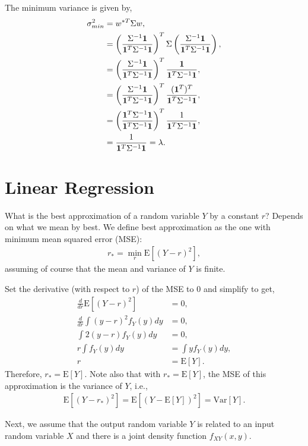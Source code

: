 \documentclass{amsart}
\theoremstyle{plain}
\numberwithin{equation}{section}
\begin{document}
The minimum variance is given by,
\begin{align*}
\sigma_{min}^2 &= w^{*T} \Sigma w,\\
&= \left(\frac{\Sigma^{-1} {\bf 1}}{{\bf 1}^T \Sigma^{-1} {\bf 1}}\right)^T
\Sigma \left(\frac{\Sigma^{-1} {\bf 1}}{{\bf 1}^T \Sigma^{-1} {\bf 1}}\right),\\
&=  \left(\frac{\Sigma^{-1} {\bf 1}}{{\bf 1}^T \Sigma^{-1} {\bf 1}}\right)^T
\frac{{\bf 1}}{{\bf 1}^T \Sigma^{-1} {\bf 1}},\\
&= \left(\frac{\Sigma^{-1} {\bf 1}}{{\bf 1}^T \Sigma^{-1} {\bf 1}}\right)^T
\frac{({\bf 1}^T)^T}{{\bf 1}^T \Sigma^{-1} {\bf 1}},\\
&= \left(\frac{{\bf 1}^T \Sigma^{-1} {\bf 1}}{{\bf 1}^T \Sigma^{-1} {\bf 1}}\right)^T
\frac{1}{{\bf 1}^T \Sigma^{-1} {\bf 1}},\\
&= \frac{1}{{\bf 1}^T \Sigma^{-1} {\bf 1}} = \lambda.
\end{align*}

\section*{Linear Regression}
What is the best approximation of a random variable $Y$ by a constant $r$? Depends on 
what we mean by best. We define best approximation as the one
with minimum mean squared error (MSE):
\begin{align*}
r_* = \min_{r} \mathrm{E}[(Y-r)^2],
\end{align*}
assuming of course that the mean and variance of $Y$ is finite. 

Set the derivative (with respect to $r$) of the MSE to $0$ and simplify to get,
\begin{align*}
\frac{d}{dr} \mathrm{E}[(Y-r)^2] &= 0,\\
\frac{d}{dr}\int (y-r)^2f_Y(y) dy &= 0,\\
\int 2(y-r)f_Y(y) dy &= 0,\\
r \int f_Y(y) dy &= \int y f_Y(y) dy,\\
r &= \mathrm{E}[Y].
\end{align*}
Therefore, $r_* = \mathrm{E}[Y]$. 
Note also that with $r_*=\mathrm{E}[Y]$, the MSE of this approximation 
is the variance of $Y$, i.e.,
\begin{align*}
\mathrm{E}[(Y-r_*)^2] = \mathrm{E}[(Y-\mathrm{E}[Y])^2]=\mathrm{Var}[Y].
\end{align*}

Next, we assume that the output random variable $Y$ is 
related to an input random variable $X$ and
there is a joint density function $f_{XY}(x,y)$. 
\end{document}
